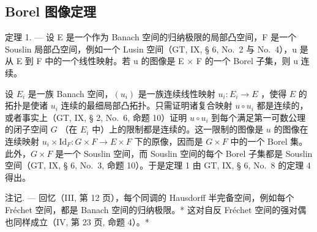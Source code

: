 \subsection{Borel 图像定理}

定理 1. --- 设 E 是一个作为 Banach 空间的归纳极限的局部凸空间，F 是一个 Souslin 局部凸空间，例如一个 Lusin 空间（GT, IX, § 6, No.~2 与 No.~4），u 是从 E 到 F 中的一个线性映射。若 u 的图像是 E × F 的一个 Borel 子集，则 u 连续。

设 \(E_i\) 是一族 Banach 空间，\((u_i)\) 是一族连续线性映射 \(u_i: E_i \to E\) ，使得 \(E\) 的拓扑是使诸 \(u_i\) 连续的最细局部凸拓扑。只需证明诸复合映射 \(u \circ u_i\) 都是连续的，或者事实上（GT, IX, § 2, No.~6, 命题 10）证明 \(u \circ u_i\) 到每个满足第一可数公理的闭子空间 \(G\) （在 \(E_i\) 中）上的限制都是连续的。这一限制的图像是 \(u\) 的图像在连续映射 \(u_i \times \text{Id}_F: G \times F \to E \times F\) 下的原像，因而是 \(G \times F\) 中的一个 Borel 集。此外，\(G \times F\) 是一个 Souslin 空间，而 Souslin 空间的每个 Borel 子集都是 Souslin 空间（GT, IX, § 6, No.~3, 命题 10）。于是定理 1 由 GT, IX, § 6, No.~8 的定理 4 得出。

注记. --- 回忆（III, 第 12 页），每个同调的 Hausdorff 半完备空间，例如每个 Fréchet 空间，都是 Banach 空间的归纳极限。* 这对自反 Fréchet 空间的强对偶也同样成立（IV, 第 23 页, 命题 4）。*

